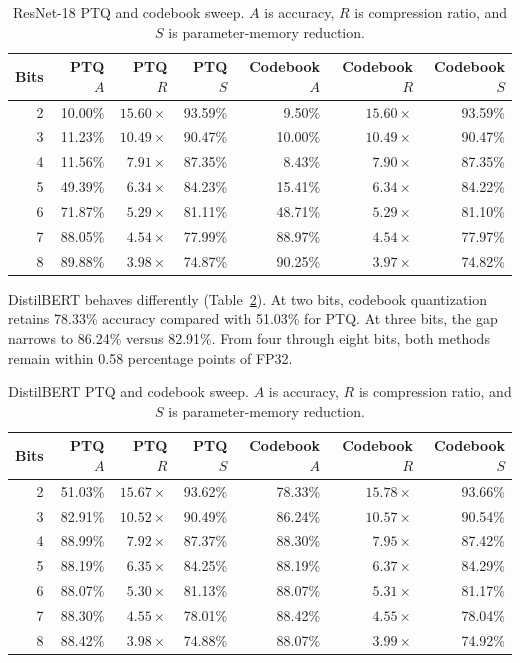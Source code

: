 \documentclass[conference]{IEEEtran}
\begin{document}
\begin{table}[t]
\caption{ResNet-18 PTQ and codebook sweep. $A$ is accuracy, $R$ is compression ratio, and $S$ is parameter-memory reduction.}
\label{tab:resnet-sweep}
\centering
\small
\begin{tabular}{@{}rrrrrrr@{}}
\toprule
Bits & PTQ $A$ & PTQ $R$ & PTQ $S$ & Codebook $A$ & Codebook $R$ & Codebook $S$ \\
\midrule
2 & 10.00\% & $15.60\times$ & 93.59\% & 9.50\% & $15.60\times$ & 93.59\% \\
3 & 11.23\% & $10.49\times$ & 90.47\% & 10.00\% & $10.49\times$ & 90.47\% \\
4 & 11.56\% & $7.91\times$ & 87.35\% & 8.43\% & $7.90\times$ & 87.35\% \\
5 & 49.39\% & $6.34\times$ & 84.23\% & 15.41\% & $6.34\times$ & 84.22\% \\
6 & 71.87\% & $5.29\times$ & 81.11\% & 48.71\% & $5.29\times$ & 81.10\% \\
7 & 88.05\% & $4.54\times$ & 77.99\% & 88.97\% & $4.54\times$ & 77.97\% \\
8 & 89.88\% & $3.98\times$ & 74.87\% & 90.25\% & $3.97\times$ & 74.82\% \\
\bottomrule
\end{tabular}
\end{table}

DistilBERT behaves differently (Table~\ref{tab:distilbert-sweep}). At two bits, codebook quantization retains 78.33\% accuracy compared with 51.03\% for PTQ. At three bits, the gap narrows to 86.24\% versus 82.91\%. From four through eight bits, both methods remain within 0.58 percentage points of FP32.

\begin{table}[t]
\caption{DistilBERT PTQ and codebook sweep. $A$ is accuracy, $R$ is compression ratio, and $S$ is parameter-memory reduction.}
\label{tab:distilbert-sweep}
\centering
\small
\begin{tabular}{@{}rrrrrrr@{}}
\toprule
Bits & PTQ $A$ & PTQ $R$ & PTQ $S$ & Codebook $A$ & Codebook $R$ & Codebook $S$ \\
\midrule
2 & 51.03\% & $15.67\times$ & 93.62\% & 78.33\% & $15.78\times$ & 93.66\% \\
3 & 82.91\% & $10.52\times$ & 90.49\% & 86.24\% & $10.57\times$ & 90.54\% \\
4 & 88.99\% & $7.92\times$ & 87.37\% & 88.30\% & $7.95\times$ & 87.42\% \\
5 & 88.19\% & $6.35\times$ & 84.25\% & 88.19\% & $6.37\times$ & 84.29\% \\
6 & 88.07\% & $5.30\times$ & 81.13\% & 88.07\% & $5.31\times$ & 81.17\% \\
7 & 88.30\% & $4.55\times$ & 78.01\% & 88.42\% & $4.55\times$ & 78.04\% \\
8 & 88.42\% & $3.98\times$ & 74.88\% & 88.07\% & $3.99\times$ & 74.92\% \\
\bottomrule
\end{tabular}
\end{table}
\end{document}
